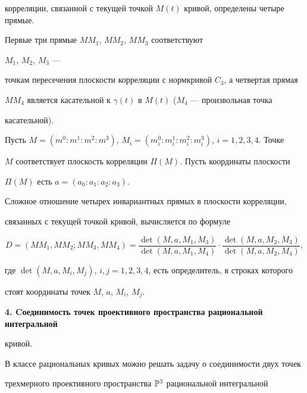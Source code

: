 корреляции, связанной с текущей точкой $M(t)$ кривой, определены четыре прямые. 


Первые три прямые $MM_1$, $MM_2$, $MM_3$ соответствуют 


$M_1$, $M_2$, $M_3$ --- 


точкам пересечения плоскости корреляции с нормкривой $C_3$, а четвертая прямая 


$MM_4$ является касательной к $\gamma(t)$ в $M(t)$ ($M_4$ --- произвольная точка 


касательной).





Пусть $M=(m^0:m^1:m^2:m^3)$, $M_i=(m^0_i:m^1_i:m^2_i:m^3_i)$, $i=1,2,3,4$. Точке 


$M$ соответствует плоскость корреляции $\Pi(M)$. Пусть координаты плоскости 


$\Pi(M)$ есть $a=(a_0:a_1:a_2:a_3)$.








\begin{thm}


Сложное отношение четырех  инвариантных прямых в плоскости корреляции, 


связанных с текущей точкой кривой, вычисляется по формуле


$$


D=(MM_1,MM_2;MM_3,MM_4)=\frac{\det(M,a,M_1,M_3)}


{\det(M,a,M_1,M_4)}\cdot


\frac{\det(M,a,M_2,M_3)}


{\det(M,a,M_2,M_4)},


$$


где $\det(M,a,M_i,M_j)$, $i,j=1,2,3,4$, есть определитель, в строках которого 


стоят координаты точек $M$, $a$, $M_i$, $M_j$.


\end{thm}








{\bf 4. Cоединимость точек проективного пространства рациональной интегральной 


кривой.} 


В классе рациональных кривых можно решать задачу о соединимости двух точек 


трехмерного проективного пространства $\Bbb{P}^3$ рациональной интегральной 


